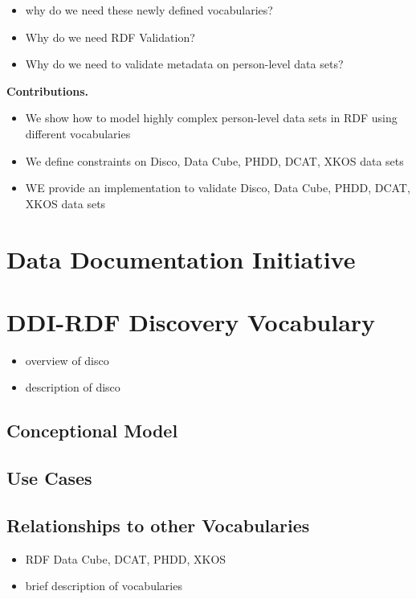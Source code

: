 \documentclass{elsart3p}    %
\begin{document}
\begin{itemize}
  \item why do we need these newly defined vocabularies?
	\item Why do we need RDF Validation?
	\item Why do we need to validate metadata on person-level data sets? 
\end{itemize}

\textbf{Contributions.}
\begin{itemize}
  \item We show how to model highly complex person-level data sets in RDF using different vocabularies 
  \item We define constraints on Disco, Data Cube, PHDD, DCAT, XKOS data sets
	\item WE provide an implementation to validate Disco, Data Cube, PHDD, DCAT, XKOS data sets 
\end{itemize}

\section{Data Documentation Initiative}

\section{DDI-RDF Discovery Vocabulary}

\begin{itemize}
  \item overview of disco
	\item description of disco
\end{itemize}

\subsection{Conceptional Model}

\subsection{Use Cases}

\subsection{Relationships to other Vocabularies}

\begin{itemize}
	\item RDF Data Cube, DCAT, PHDD, XKOS
	\item brief description of vocabularies
\end{itemize}
\end{document}
